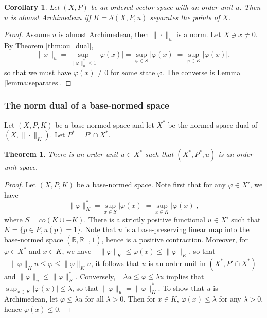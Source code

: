 \documentclass[12pt]{article}
\newtheorem{thm}{Theorem}
\newtheorem{coro}{Corollary}
\theoremstyle{remark}
\newcommand{\<}{\langle}
\begin{document}
\begin{coro} Let $(X,P)$ be an ordered vector space with an order unit $u$. Then $u$ is almost Archimedean iff $K=\mathcal S(X,P,u)$ separates the points of $X$.

\end{coro}

\begin{proof} Assume $u$ is almost Archimedean, then $\|\cdot\|_u$ is a norm. Let $X\ni x\ne 0$. By Theorem \ref{thm:ou_dual},
\[
\|x\|_u=\sup_{\|\varphi\|_u^*\le 1} |\varphi(x)|=\sup_{\varphi\in S} |\varphi(x)|=\sup_{\varphi\in K}|\varphi(x)|,
\]
so that we must have $\varphi(x)\ne 0$ for some state $\varphi$. The converse is Lemma \ref{lemma:separates}.

\end{proof}



\subsubsection*{The norm dual of a base-normed space}

Let $(X,P,K)$ be a base-normed space and let $X^*$ be the normed space dual of $(X,\|\cdot\|_K)$. Let $P^*= P'\cap X^*$.

\begin{thm} There is an order unit $u\in X^*$ such that $(X^*,P^*,u)$  is an order unit space.  

\end{thm}

\begin{proof} Let $(X,P,K)$ be a base-normed space. Note first that for any $\varphi\in X'$, we have
\[
\|\varphi\|_K^*=\sup_{x\in S} |\varphi(x)|=\sup_{x\in K} |\varphi(x)|,
\]
where $S=co(K\cup -K)$. There is a strictly positive functional $u\in X'$ such that 
$K=\{p\in P, u(p)=1\}$. Note that $u$ is a base-preserving linear map into the base-normed space $(\mathbb R,\mathbb R^+,1)$, hence 
is a positive contraction. Moreover, for  $\varphi\in X^*$ and $x\in K$, we have
$-\|\varphi\|_K\le \varphi(x)\le \|\varphi\|_K$, so that $-\|\varphi\|_Ku\le \varphi\le \|\varphi\|_Ku$, it follows that $u$ is an order unit in $(X^*, P'\cap X^*)$ and $\|\varphi\|_u\le \|\varphi\|_K^*$. Conversely,  $-\lambda u\le \varphi\le \lambda u$ 
implies that $\sup_{x\in K}|\varphi(x)|\le \lambda$, so that $\|\varphi\|_u= \|\varphi\|_K^*$. To show that $u$ is Archimedean, 
 let $\varphi\le \lambda u$ for all $\lambda>0$. Then for $x\in K$, $\varphi(x)\le \lambda$ for any $\lambda>0$, hence $\varphi(x)\le 0$. 

\end{proof}
\end{document}

